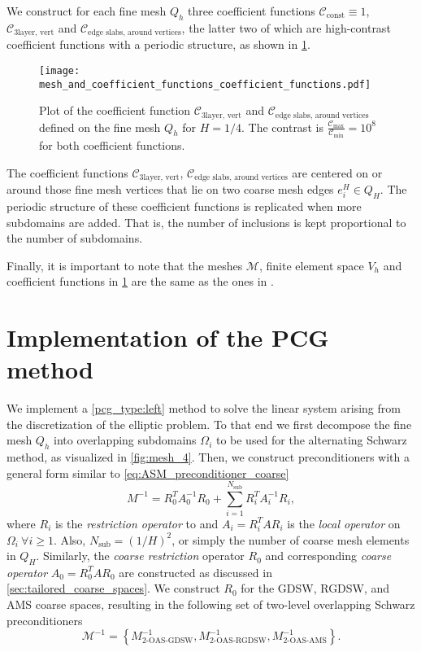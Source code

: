We construct for each fine mesh $Q_h$ three coefficient functions $\mathcal{C}_{\text{const}}\equiv 1$, $\mathcal{C}_{\text{3layer, vert}}$ and $\mathcal{C}_{\text{edge slabs, around vertices}}$, the latter two of which are high-contrast coefficient functions with a periodic structure, as shown in \cref{fig:coefficient_functions}. 
\begin{figure}[H]
    \texttt{[image: mesh\_and\_coefficient\_functions\_coefficient\_functions.pdf]}
    \caption{Plot of the coefficient function $\mathcal{C}_{\text{3layer, vert}}$ and $\mathcal{C}_{\text{edge slabs, around vertices}}$ defined on the fine mesh $Q_h$ for $H=1/4$. The contrast is $\frac{\mathcal{C}_{\text{max}}}{\mathcal{C}_{\text{min}}} = 10^8$ for both coefficient functions.}
    \label{fig:coefficient_functions}
\end{figure}
The coefficient functions $\mathcal{C}_{\text{3layer, vert}}$, $\mathcal{C}_{\text{edge slabs, around vertices}}$ are centered on or around those fine mesh vertices that lie on two coarse mesh edges $e_i^H\in Q_H$. The periodic structure of these coefficient functions is replicated when more subdomains are added. That is, the number of inclusions is kept proportional to the number of subdomains.

Finally, it is important to note that the meshes $\mathcal{M}$, finite element space $V_h$ and coefficient functions in \cref{fig:coefficient_functions} are the same as the ones in \cite{ams_coarse_space_comp_study_Alves2024}.

\section{Implementation of the PCG method}\label{sec:implementation_pcg}
We implement a \ref{pcg_type:left} method to solve the linear system arising from the discretization of the elliptic problem. To that end we first decompose the fine mesh $Q_h$ into overlapping subdomains $\Omega_i$ to be used for the alternating Schwarz method, as visualized in \cref{fig:mesh_4}. Then, we construct preconditioners with a general form similar to \cref{eq:ASM_preconditioner_coarse}
\[
    M^{-1} = R_0^T A_0^{-1} R_0 + \sum_{i=1}^{N_{\text{sub}}} R_i^T A_i^{-1} R_i,
\]
where $R_i$ is the \textit{restriction operator} to and $A_i = R_i^T A R_i$ is the \textit{local operator} on $\Omega_i \ \forall i \geq 1$. Also, $N_{\text{sub}} = (1/H)^2$, or simply the number of coarse mesh elements in $Q_H$. Similarly, the \textit{coarse restriction} operator $R_0$ and corresponding \textit{coarse operator} $A_0 = R_0^T A R_0$ are constructed as discussed in \cref{sec:tailored_coarse_spaces}. We construct $R_0$ for the GDSW, RGDSW, and AMS coarse spaces, resulting in the following set of two-level overlapping Schwarz preconditioners
\begin{equation}
    \mathcal{M}^{-1} =  \left\{M^{-1}_{\text{2-OAS-GDSW}}, M^{-1}_{\text{2-OAS-RGDSW}}, M^{-1}_{\text{2-OAS-AMS}}\right\}.
    \label{eq:preconditioners}
\end{equation}